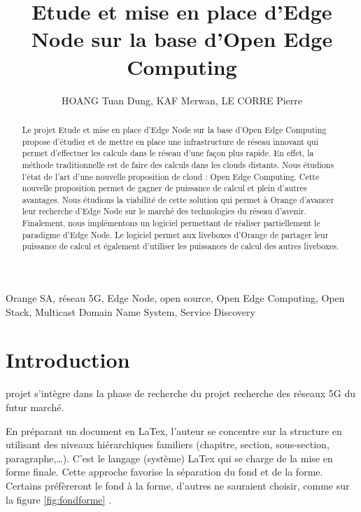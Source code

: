 \documentclass[twocolumn,a4paper]{IEEEtranfr}
\begin{document}
\title{Etude et mise en place d'Edge Node sur la base d'Open Edge Computing}
\author{HOANG Tuan Dung, KAF Merwan, LE CORRE Pierre} 

\maketitle

\begin{abstract}
Le projet Etude et mise en place d'Edge Node sur la base d'Open Edge Computing propose d'étudier et de mettre en place une infrastructure de réseau innovant qui permet d'effectuer les calculs dans le réseau d'une façon plus rapide. En effet, la méthode traditionnelle est de faire des calculs dans les clouds distants. Nous étudions l'état de l'art d'une nouvelle proposition de cloud : Open Edge Computing. Cette nouvelle proposition permet de gagner de puissance de calcul et plein d'autres avantages. Nous étudions la viabilité de cette solution qui permet à Orange d'avancer leur recherche d'Edge Node sur le marché des technologies du réseau d'avenir. Finalement, nous implémentons un logiciel permettant de réaliser partiellement le paradigme d'Edge Node. Le logiciel permet aux liveboxes d'Orange de partager leur puissance de calcul et également d'utiliser les puissances de calcul des autres liveboxes.
\end{abstract} 

\begin{keywords}
Orange SA, réseau 5G, Edge Node, open source, Open Edge Computing, Open Stack, Multicast Domain Name System, Service Discovery
\end{keywords}



\section{Introduction}

 projet s'intègre dans la phase de recherche du projet recherche des réseaux 5G du futur marché. 

En préparant un document en LaTex, l'auteur se concentre sur la structure en
utilisant des niveaux hiérarchiques familiers
(chapitre, section, sous-section, paragraphe,\ldots). C'est le langage
(système) LaTex qui se charge de la mise en forme finale. Cette approche favorise la séparation du
fond et de la forme. Certains préfèreront le fond à la forme, d'autres ne
sauraient choisir, comme sur la figure \ref{fig:fondforme} . 
\end{document}
